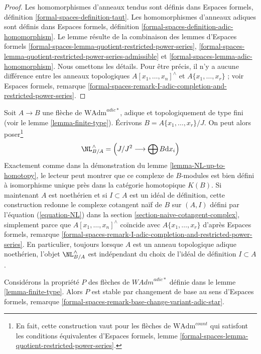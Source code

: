 \begin{proof}
Les homomorphismes d'anneaux tendus sont définis dans Espaces formels,
définition \ref{formal-spaces-definition-taut}. Les homomorphismes d'anneaux
adiques sont définis dans Espaces formels, définition
\ref{formal-spaces-definition-adic-homomorphism}. Le lemme résulte de la
combinaison des lemmes d'Espaces formels
\ref{formal-spaces-lemma-quotient-restricted-power-series},
\ref{formal-spaces-lemma-quotient-restricted-power-series-admissible} et
\ref{formal-spaces-lemma-adic-homomorphism}. Nous omettons les détails. Pour
être précis, il n'y a aucune différence entre les anneaux topologiques
$A[x_1, \ldots, x_n]^\wedge$ et $A\{x_1, \ldots, x_r\}$ ; voir Espaces
formels, remarque
\ref{formal-spaces-remark-I-adic-completion-and-restricted-power-series}.
\end{proof}

\begin{remark}
\label{remark-NL-well-defined-topological}
Soit $A \to B$ une flèche de $\text{WAdm}^{adic*}$, adique et
topologiquement de type fini (voir le lemme \ref{lemma-finite-type}). Écrivons
$B = A\{x_1, \ldots, x_r\}/J$. On peut alors poser\footnote{En fait, cette
construction vaut pour les flèches de $\text{WAdm}^{count}$ qui satisfont les
conditions équivalentes d'Espaces formels, lemme
\ref{formal-spaces-lemma-quotient-restricted-power-series}.}
$$
\NL_{B/A}^\wedge = \left(J/J^2 \longrightarrow \bigoplus B\text{d}x_i\right)
$$
Exactement comme dans la démonstration du lemme
\ref{lemma-NL-up-to-homotopy}, le lecteur peut montrer que ce complexe de
$B$-modules est bien défini à isomorphisme unique près dans la catégorie
homotopique $K(B)$. Si maintenant $A$ est noethérien et si $I \subset A$ est
un idéal de définition, cette construction redonne le complexe cotangent naïf
de $B$ sur $(A, I)$ défini par l'équation (\ref{equation-NL}) dans la section
\ref{section-naive-cotangent-complex}, simplement parce que
$A[x_1, \ldots, x_n]^\wedge$ coïncide avec $A\{x_1, \ldots, x_r\}$ d'après
Espaces formels, remarque
\ref{formal-spaces-remark-I-adic-completion-and-restricted-power-series}. En
particulier, toujours lorsque $A$ est un anneau topologique adique noethérien,
l'objet $\NL_{B/A}^\wedge$ est indépendant du choix de l'idéal de définition
$I \subset A$.
\end{remark}

\begin{lemma}
\label{lemma-base-change-finite-type}
Considérons la propriété $P$ des flèches de $\textit{WAdm}^{adic*}$ définie
dans le lemme \ref{lemma-finite-type}. Alors $P$ est stable par changement de
base au sens d'Espaces formels, remarque
\ref{formal-spaces-remark-base-change-variant-adic-star}.
\end{lemma}

